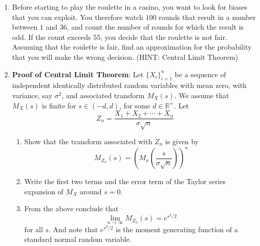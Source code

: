 \documentclass{article}
\newcommand{\Rb}{\mathbb{R}}
\newcommand{\soln}[1]{\textbf{Solution}:#1}
\newcommand{\bkt}[1]{\left(#1\right)}
\begin{document}
\begin{enumerate}
\begin{enumerate}
			\soln{
			Goes up by a factor of $4$.
			}
			\item
			The value of $\delta$ is reduced to half its original value.\\
			\soln{
			Goes up by a factor of $2$.
			}
		\end{enumerate}
		\item
		Before starting to play the roulette in a casino, you want to look for biases that you can exploit. You therefore watch $100$ rounds that result in a number between $1$ and $36$, and count the number of rounds for which the result is odd. If the count exceeds $55$, you decide that the roulette is not fair. Assuming that the roulette is fair, find an approximation for the probability that you will make the wrong decision. (HINT: Central Limit Theorem)
		\item
		\textbf{Proof of Central Limit Theorem}: Let $\{X_i\}_{i=1}^n$ be a sequence of independent identically distributed random variables with mean zero, with variance, say $\sigma^2$, and associated transform $M_X(s)$. We assume that $M_X(s)$ is finite for $s \in \bkt{-d,d}$, for some $d \in \Rb^+$. Let
		$$Z_n = \dfrac{X_1+X_2+\cdots+X_n}{\sigma \sqrt{n}}$$
		\begin{enumerate}
			\item
			Show that the transform associated with $Z_n$ is given by
			$$M_{Z_n}(s) = \bkt{M_x\bkt{\dfrac{s}{\sigma\sqrt{n}}}}^n$$
			\item
			Write the first two terms and the error term of the Taylor series expansion of $M_X$ around $s=0$.
			\item
			From the above conclude that
			$$\lim_{n \to \infty} M_{Z_n}(s) = e^{s^2/2}$$
			for all $s$. And note that $e^{s^2/2}$ is the moment generating function of a standard normal random variable.
		\end{enumerate}
	\end{enumerate}
\end{document}
